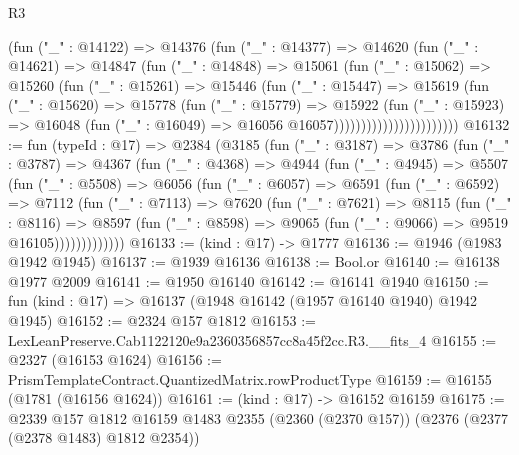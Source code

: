 \begin{lexlean}{R3}
\begin{coremodule}
                            (fun ("_" : @14122) =>
                            @14376
                              (fun ("_" : @14377) =>
                              @14620
                                (fun ("_" : @14621) =>
                                @14847
                                  (fun ("_" : @14848) =>
                                  @15061
                                    (fun ("_" : @15062) =>
                                    @15260
                                      (fun ("_" : @15261) =>
                                      @15446
                                        (fun ("_" : @15447) =>
                                        @15619
                                          (fun ("_" : @15620) =>
                                          @15778
                                            (fun ("_" : @15779) =>
                                            @15922
                                              (fun ("_" : @15923) =>
                                              @16048
                                                (fun ("_" : @16049) =>
                                                @16056 @16057)))))))))))))))))))))))
@16132 := fun (typeId : @17) =>
  @2384
    (@3185
      (fun ("_" : @3187) =>
      @3786
        (fun ("_" : @3787) =>
        @4367
          (fun ("_" : @4368) =>
          @4944
            (fun ("_" : @4945) =>
            @5507
              (fun ("_" : @5508) =>
              @6056
                (fun ("_" : @6057) =>
                @6591
                  (fun ("_" : @6592) =>
                  @7112
                    (fun ("_" : @7113) =>
                    @7620
                      (fun ("_" : @7621) =>
                      @8115
                        (fun ("_" : @8116) =>
                        @8597
                          (fun ("_" : @8598) =>
                          @9065 (fun ("_" : @9066) => @9519 @16105)))))))))))))
@16133 := (kind : @17) -> @1777
@16136 := @1946 (@1983 @1942 @1945)
@16137 := @1939 @16136
@16138 := Bool.or
@16140 := @16138 @1977 @2009
@16141 := @1950 @16140
@16142 := @16141 @1940
@16150 := fun (kind : @17) => @16137 (@1948 @16142 (@1957 @16140 @1940) @1942 @1945)
@16152 := @2324 @157 @1812
@16153 := LexLeanPreserve.Cab1122120e9a2360356857cc8a45f2cc.R3.__fits_4
@16155 := @2327 (@16153 @1624)
@16156 := PrismTemplateContract.QuantizedMatrix.rowProductType
@16159 := @16155 (@1781 (@16156 @1624))
@16161 := (kind : @17) -> @16152 @16159
@16175 := @2339
    @157
    @1812
    @16159
    @1483
    @2355
    (@2360 (@2370 @157))
    (@2376 (@2377 (@2378 @1483) @1812 @2354))

\end{coremodule}
\end{lexlean}
